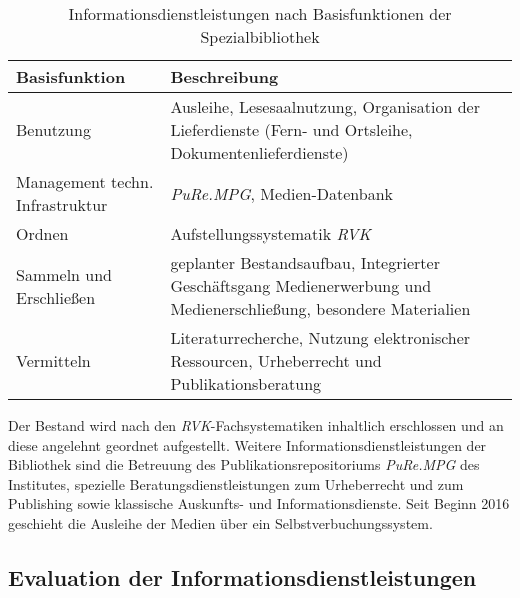 \begingroup
\setlength{\tabcolsep}{12pt} %
\renewcommand{\arraystretch}{1.5} 
\begin{table}[h]
    \centering
    \begin{adjustbox}{max width=\textwidth}
    \begin{tabular}{p{}p{}}
       \toprule
       Basisfunktion                            & Beschreibung\\
       \midrule
        Benutzung                               &Ausleihe, Lesesaalnutzung, Organisation der Lieferdienste (Fern- und Ortsleihe, Dokumentenlieferdienste)\\
        Management techn. Infrastruktur         &\textit{\acrshort{PuRe.MPG}}, Medien-Datenbank\\
        Ordnen                                  &Aufstellungssystematik \textit{\acrshort{RVK}}\\
        Sammeln und Erschließen                 &geplanter Bestandsaufbau, Integrierter Geschäftsgang Medienerwerbung und Medienerschließung, besondere Materialien\\
        Vermitteln                              &Literaturrecherche, Nutzung elektronischer Ressourcen, Urheberrecht und Publikationsberatung\\
   
       \bottomrule
    \end{tabular}
    \end{adjustbox}
    \caption{%
        Informationsdienstleistungen nach Basisfunktionen der Spezialbibliothek
    }
    \label{tab:Informationsdienstleistungen}
    \end{table}
\endgroup

Der Bestand wird nach den \textit{\acrshort{RVK}}-Fachsystematiken inhaltlich erschlossen und an diese angelehnt geordnet aufgestellt.
Weitere Informationsdienstleistungen der Bibliothek sind die Betreuung des Publikationsrepositoriums \textit{\acrshort{PuRe.MPG}} des Institutes, spezielle Beratungsdienstleistungen 
zum Urheberrecht und zum Publishing sowie klassische Auskunfts- und Informationsdienste. Seit Beginn 2016 
geschieht die Ausleihe der Medien über ein Selbstverbuchungssystem.\\

\subsection{Evaluation der Informationsdienstleistungen}

